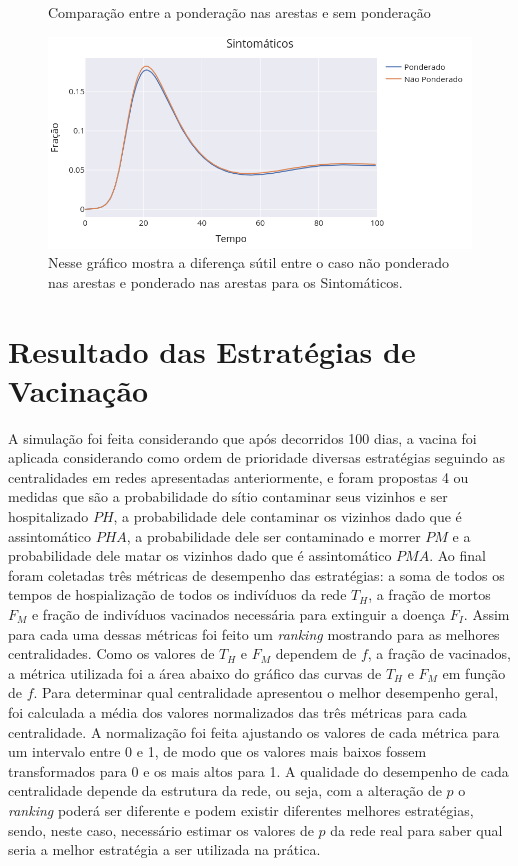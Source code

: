 \begin{figure}[H]
    \centering
    \captionsetup{font=normalsize,skip=0.8pt,singlelinecheck=on,labelsep=endash}
    \caption{Comparação entre a ponderação nas arestas e sem ponderação}
    \includegraphics[scale= 0.5]{figuras/compara_ponderado_nponderado.png}
    \captionsetup{font=small,justification=justified}
    
    \caption*{Nesse gráfico mostra a diferença sútil entre o caso não ponderado  nas arestas e ponderado nas arestas para os Sintomáticos. 
    }
    \label{fig:compara_ponderado_nponderado}
\end{figure}

\section{Resultado das Estratégias de Vacinação}

A simulação foi feita considerando que após decorridos 100 dias, a vacina foi aplicada considerando como ordem de prioridade diversas estratégias seguindo as centralidades em redes apresentadas anteriormente, e foram propostas 4 ou medidas que são a probabilidade do sítio contaminar seus vizinhos e ser hospitalizado $PH$, a probabilidade dele contaminar os vizinhos dado que é assintomático $PHA$, a probabilidade dele ser contaminado e morrer $PM$ e a probabilidade dele matar os vizinhos dado que é assintomático $PMA$. Ao final foram coletadas 
três métricas de desempenho das estratégias: 
a soma de todos os tempos de hospialização de todos os indivíduos da rede $T_H$, a fração de mortos $F_M$ e fração de indivíduos 
vacinados 
necessária para extinguir a doença $F_I$.
Assim para cada 
uma dessas métricas
foi feito um \textit{ranking} mostrando para as melhores centralidades.
Como os valores de $T_H$ e $F_M$ dependem de $f$, 
a fração de vacinados, 
a métrica utilizada foi a área abaixo do gráfico das curvas de $T_H$ e $F_M$ em função de $f$.
Para determinar qual centralidade apresentou o melhor desempenho geral, foi calculada a média dos valores normalizados das três métricas para cada centralidade. A normalização foi feita ajustando os valores de cada métrica para um intervalo entre 0 e 1, de modo que os valores mais baixos fossem transformados para 0 e os mais altos para 1.
A qualidade 
do desempenho
de cada centralidade 
depende
da estrutura da rede, ou seja, com a alteração de $p$ o \textit{ranking} 
poderá ser diferente e  
podem existir diferentes melhores estratégias, 
sendo, neste caso, necessário estimar os valores de $p$ da rede real para saber qual seria a melhor estratégia
a ser utilizada na prática. 



